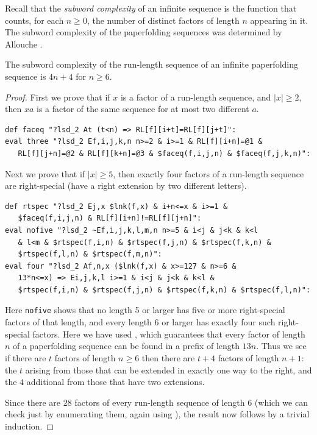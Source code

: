 \documentclass[12pt,reqno]{article}
\begin{document}
Recall that the {\it subword complexity} of an infinite sequence is the
function that counts, for each $n \geq 0$, the number of distinct factors
of length $n$ appearing in it.  The subword complexity of the paperfolding
sequences was determined by Allouche 
\cite{Allouche:1992}.

\begin{theorem}
The subword complexity of the run-length sequence of an infinite paperfolding
sequence is $4n+4$ for $n \geq 6$.
\end{theorem}

\begin{proof}
First we prove that if $x$ is a factor of a run-length sequence, and
$|x| \geq 2$, then $xa$ is a factor of the same sequence for at most
two different $a$.
\begin{verbatim}
def faceq "?lsd_2 At (t<n) => RL[f][i+t]=RL[f][j+t]":
eval three "?lsd_2 Ef,i,j,k,n n>=2 & i>=1 & RL[f][i+n]=@1 &
   RL[f][j+n]=@2 & RL[f][k+n]=@3 & $faceq(f,i,j,n) & $faceq(f,j,k,n)":
\end{verbatim}

Next we prove that if $|x| \geq 5$, then exactly four factors of a run-length
sequence are right-special (have a right extension by two different letters). 
\begin{verbatim}
def rtspec "?lsd_2 Ej,x $lnk(f,x) & i+n<=x & i>=1 &
   $faceq(f,i,j,n) & RL[f][i+n]!=RL[f][j+n]":
eval nofive "?lsd_2 ~Ef,i,j,k,l,m,n n>=5 & i<j & j<k & k<l
   & l<m & $rtspec(f,i,n) & $rtspec(f,j,n) & $rtspec(f,k,n) &
   $rtspec(f,l,n) & $rtspec(f,m,n)":
eval four "?lsd_2 Af,n,x ($lnk(f,x) & x>=127 & n>=6 &
   13*n<=x) => Ei,j,k,l i>=1 & i<j & j<k & k<l &
   $rtspec(f,i,n) & $rtspec(f,j,n) & $rtspec(f,k,n) & $rtspec(f,l,n)":
\end{verbatim}
Here {\tt nofive} shows that no length 5 or larger has five
or more right-special factors of that length, and every length $6$ or larger
has exactly four such right-special factors.  Here we have used
\cite[Thm.~12.2.2]{Shallit:2023}, which guarantees that every factor
of length $n$ of a paperfolding sequence can be found in a prefix
of length $13n$.   Thus we see if there are $t$ factors of length $n \geq 6$
then there are $t+4$ factors of length $n+1$:  the $t$ arising from those
that can be extended in exactly one way to the right, and the $4$ additional
from those that have two extensions.

Since there are $28$ factors of every run-length sequence of length $6$ 
(which we can check just by enumerating them, again
using \cite[Thm.~12.2.2]{Shallit:2023}), the result now
follows by a trivial induction.
\end{proof}
\end{document}
